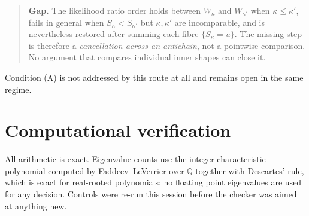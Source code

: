 \documentclass[11pt]{article}
\theoremstyle{plain}
\theoremstyle{definition}
\begin{document}
\begin{quote}
\textbf{Gap.} The likelihood ratio order holds between $W_\kappa$ and $W_{\kappa'}$ when
$\kappa\le\kappa'$, fails in general when $S_\kappa<S_{\kappa'}$ but $\kappa,\kappa'$ are
incomparable, and is nevertheless restored after summing each fibre $\{S_\kappa=u\}$. The missing
step is therefore a \emph{cancellation across an antichain}, not a pointwise comparison. No
argument that compares individual inner shapes can close it.
\end{quote}

Condition (A) is not addressed by this route at all and remains open in the same regime.

\section{Computational verification}

All arithmetic is exact. Eigenvalue counts use the integer characteristic polynomial computed by
Faddeev--LeVerrier over $\mathbb{Q}$ together with Descartes' rule, which is exact for real-rooted
polynomials; no floating point eigenvalues are used for any decision. Controls were re-run this
session before the checker was aimed at anything new.
\end{document}
